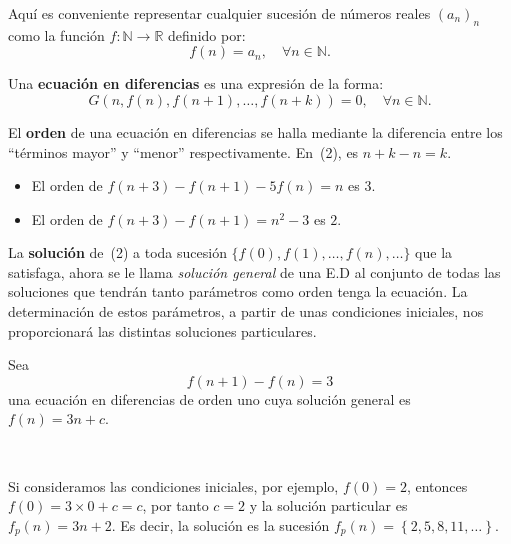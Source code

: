 \begin{frame}
	\frametitle{\subsecname}
	Aquí es conveniente representar cualquier sucesión de números reales $(a_{n})_{n} $ como la función $f\colon\mathds{N}\rightarrow\mathds{R}$ definido por: \[ f(n)=a_{n},\quad\forall n\in\mathds{N}. \]
	\begin{definition}
		Una \textbf{ecuación en diferencias} es una expresión de la forma:
		\begin{equation}\label{eq:diffeq}
		G\left(n,f(n),f\left(n+1\right),\ldots,f\left(n+k\right)\right)=0,\quad\forall n\in\mathds{N}.
		\end{equation}
	\end{definition}
	El \textbf{orden} de una ecuación en diferencias se halla mediante la diferencia entre los ``términos mayor'' y ``menor'' respectivamente. En~(2), es \alert{$n+k-n=k$}.%
	\begin{example}
		\begin{itemize}
			\item El \alert{orden} de $f\left(n+3\right)-f\left(n+1\right)-5f(n)=n$ es \alert{$3$}.
			\item El \alert{orden} de $f\left(n+3\right)-f\left(n+1\right)=n^{2}-3$ es \alert{$2$}.
		\end{itemize}
	\end{example}
\end{frame}

\begin{frame}
	\begin{definition}
		La \textbf{solución} de~(2) a toda sucesión $\{f\left(0\right),f\left(1\right),\ldots,f(n),\ldots\}$ que la satisfaga, ahora se le llama \emph{solución general} de una E.D al conjunto de todas las soluciones que tendrán tanto parámetros como orden tenga la ecuación. La determinación de estos parámetros, a partir de unas condiciones iniciales, nos proporcionará las distintas soluciones particulares.
	\end{definition}

	\begin{example}
		Sea \[ f\left(n+1\right)-f\left(n\right)=3 \] una ecuación en diferencias de orden uno cuya solución general es $f\left(n\right)=3n+c$.

	\

		Si consideramos las condiciones iniciales, por ejemplo, $f(0)=2$, entonces $f(0)=3\times0+c=c$, por tanto $c=2$ y la solución particular es $f_{p}(n)=3n+2$.
		Es decir, la solución es la sucesión $f_{p}(n)=\left\{2,5,8,11,\ldots\right\}$.
	\end{example}
\end{frame}

